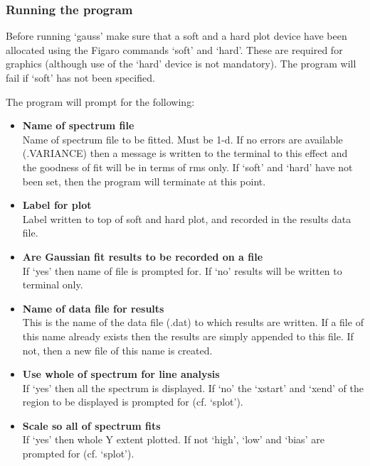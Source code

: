
\subsubsection{\label{techno12running}Running the program}

   Before running `gauss' make sure that a soft and a hard plot device
   have been allocated using the Figaro commands `soft' and `hard'.
   These are required for graphics (although use of the `hard' device is
   not mandatory). The program will fail if `soft' has not been
   specified.

   The program will prompt for the following:

\begin{itemize}
\item{\bf Name of spectrum file}\ \\
   Name of spectrum file to be fitted. Must be 1-d. If no errors are
   available (.VARIANCE) then a message is written to the terminal to
   this effect and the goodness of fit will be in terms of rms only.
   If `soft' and `hard' have not been set, then the program will
   terminate at this point.
\item{\bf Label for plot}\ \\
   Label written to top of soft and hard plot, and recorded in the
   results data file.
\item{\bf Are Gaussian fit results to be recorded on a file}\ \\
   If `yes' then name of file is prompted for. If `no' results will be
   written to terminal only.
\item{\bf Name of data file for results}\ \\
   This is the name of the data file (.dat) to which results are
   written. If a file of this name already exists then the results are
   simply appended to this file. If not, then a new file of this name is
   created.
\item{\bf Use whole of spectrum for line analysis}\ \\
   If `yes' then all the spectrum is displayed. If `no' the `xstart' and
   `xend' of the region to be displayed is prompted for (cf. `splot').
\item{\bf Scale so all of spectrum fits}\ \\
   If `yes' then whole Y extent plotted. If not `high', `low' and `bias'
   are prompted for (cf. `splot').
\end{itemize}

